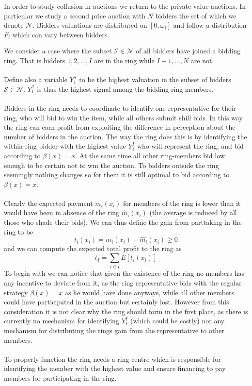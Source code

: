 In order to study collusion in auctions we return to the private value auctions. In particular we study a second price auction with $N$ bidders the set of which we denote $\mathcal{N}$. Bidders valuations are distributed on $[0,\omega_i]$ and follow a distribution $F_i$ which can vary between bidders.

We consider a case where the subset $\mathcal{I} \in \mathcal{N}$ of all bidders have joined a bidding ring. That is bidders $1,2,...,I$ are in the ring while $I+1,...,N$ are not.
\\ \\
Define also a variable $Y_1^{\mathcal{S}}$ to be the highest valuation in the subset of bidders $\mathcal{S} \in \mathcal{N}$. $Y_1^{\mathcal{I}}$ is thus the highest signal among the bidding ring members. 
\\ \\ 
Bidders in the ring needs to coordinate to identify one representative for their ring, who will bid to win the item, while all others submit shill bids. In this way the ring can earn profit from exploiting the difference in perception about the number of bidders in the auction. The way the ring does this is by identifying the within-ring bidder with the highest value $Y_1^I$ who will represent the ring, and bid according to $\beta(x)=x$. At the same time all other ring-members bid low enough to be certain not to win the auction. To bidders outside the ring seemingly nothing changes so for them it is still optimal to bid according to $\beta(x)=x$.
\\ \\ 
Clearly the expected payment $m_i(x_i)$ for members of the ring is lower than it would have been in absence of the ring $\hat{m}_i(x_i)$ (the average is reduced by all those who shade their bids). We can thus define the gain from parttaking in the ring to be 
\begin{equation}
    t_i(x_i) = m_i(x_i) - \hat{m}_i (x_i) \geq 0
\end{equation}
and we can compute the expected total profit to the ring as 
\begin{equation}
    t_I = \sum_{i\in I} E[t_i(x_i)]
\end{equation}
To begin with we can notice that given the existence of the ring no members has any incentive to deviate from it, as the ring representative bids with the regular strategy $\beta(x)=x$ as he would have done anyways, while all other members could have participated in the auction but certainly lost. However from this consideration it is not clear why the ring should form in the first place, as there is currently no mechanism for identifying $Y_1^I$ (which could be costly) nor any mechanism for distributing the rings gain from the representative to other members. 
\\ \\
To properly function the ring needs a ring-centre which is responsible for identifying the member with the highest value and ensure financing to pay members for participating in the ring.
\\ \\
